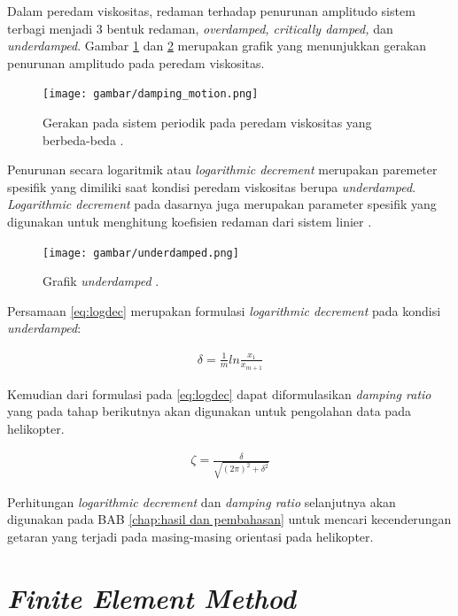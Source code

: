Dalam peredam viskositas, redaman terhadap penurunan amplitudo sistem terbagi menjadi 3 bentuk redaman, \textit{overdamped, critically damped,} dan \textit{underdamped}. Gambar \ref{fig:damping_motion} dan \ref{fig:underdamped} merupakan grafik yang menunjukkan gerakan penurunan amplitudo pada peredam viskositas. 

\begin{figure}[H]
	\centering
	\texttt{[image: gambar/damping\_motion.png]}
	\caption{Gerakan pada sistem periodik pada peredam viskositas yang berbeda-beda \cite{rao2004mechanical}.}
	\label{fig:damping_motion}
\end{figure}

Penurunan secara logaritmik atau \textit{logarithmic decrement} merupakan paremeter spesifik yang dimiliki saat kondisi peredam viskositas berupa \textit{underdamped}. \textit{Logarithmic decrement} pada dasarnya juga merupakan parameter spesifik yang digunakan untuk menghitung koefisien redaman dari sistem linier \cite{Lojewski2020InfluenceOC}. 

\begin{figure}[H]
	\centering
	\texttt{[image: gambar/underdamped.png]}
	\caption{Grafik \textit{underdamped} \cite{rao2004mechanical}.}
	\label{fig:underdamped}
\end{figure}

Persamaan \ref{eq:logdec} merupakan formulasi \textit{logarithmic decrement} pada kondisi \textit{underdamped}:

\begin{align}
	\delta = \frac{1}{m}ln\frac{x_1}{x_{m+1}}
	\label{eq:logdec}
\end{align}

Kemudian dari formulasi pada \ref{eq:logdec} dapat diformulasikan \textit{damping ratio} yang pada tahap berikutnya akan digunakan untuk pengolahan data pada helikopter.

\begin{align}
	\zeta=\frac{\delta}{\sqrt{\left( 2\pi \right)^2+\delta^2}}
	\label{eq:damp_ratio}
\end{align}

Perhitungan \textit{logarithmic decrement} dan \textit{damping ratio} selanjutnya akan digunakan pada BAB \ref{chap:hasil dan pembahasan} untuk mencari kecenderungan getaran yang terjadi pada masing-masing orientasi pada helikopter.

\section{\textit{Finite Element Method}}
\label{FEM}

